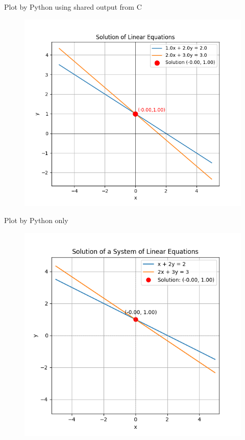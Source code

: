 \documentclass{beamer}
\begin{document}
\begin{frame}{Plot by Python using shared output from C}
\begin{figure}[H]
\centering
\includegraphics[width=0.8\columnwidth]{../figs/fig1.png}
\caption{}
\label{fig:1}
\end{figure}
\end{frame}
 
\begin{frame}{Plot by Python only}
\begin{figure}[H]
\centering
\includegraphics[width=0.7\columnwidth]{../figs/fig2.png}
\caption{}
\label{fig:2}
\end{figure}
\end{frame}
\end{document}
